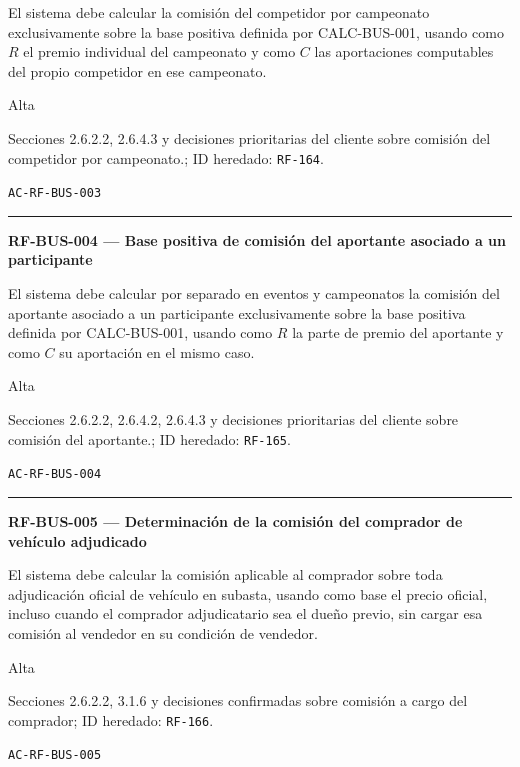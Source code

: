 \documentclass[10pt,letterpaper]{article}
\begin{document}
\begin{description}[style=nextline,leftmargin=3.15cm,labelwidth=2.8cm,font=\normalfont\bfseries]
\item[Obligación] El sistema debe calcular la comisión del competidor por campeonato exclusivamente sobre la base positiva definida por CALC-BUS-001, usando como $R$ el premio individual del campeonato y como $C$ las aportaciones computables del propio competidor en ese campeonato.
\item[Prioridad] Alta
\item[Procedencia] Secciones 2.6.2.2, 2.6.4.3 y decisiones prioritarias del cliente sobre comisión del competidor por campeonato.; ID heredado: \texttt{RF-164}.
\item[Verificación] \texttt{AC-RF-BUS-003}
\end{description}
\vspace{0.25em}\hrule\vspace{0.65em}
\noindent\textbf{RF-BUS-004 --- Base positiva de comisión del aportante asociado a un participante}\par
\begin{description}[style=nextline,leftmargin=3.15cm,labelwidth=2.8cm,font=\normalfont\bfseries]
\item[Obligación] El sistema debe calcular por separado en eventos y campeonatos la comisión del aportante asociado a un participante exclusivamente sobre la base positiva definida por CALC-BUS-001, usando como $R$ la parte de premio del aportante y como $C$ su aportación en el mismo caso.
\item[Prioridad] Alta
\item[Procedencia] Secciones 2.6.2.2, 2.6.4.2, 2.6.4.3 y decisiones prioritarias del cliente sobre comisión del aportante.; ID heredado: \texttt{RF-165}.
\item[Verificación] \texttt{AC-RF-BUS-004}
\end{description}
\vspace{0.25em}\hrule\vspace{0.65em}
\noindent\textbf{RF-BUS-005 --- Determinación de la comisión del comprador de vehículo adjudicado}\par
\begin{description}[style=nextline,leftmargin=3.15cm,labelwidth=2.8cm,font=\normalfont\bfseries]
\item[Obligación] El sistema debe calcular la comisión aplicable al comprador sobre toda adjudicación oficial de vehículo en subasta, usando como base el precio oficial, incluso cuando el comprador adjudicatario sea el dueño previo, sin cargar esa comisión al vendedor en su condición de vendedor.
\item[Prioridad] Alta
\item[Procedencia] Secciones 2.6.2.2, 3.1.6 y decisiones confirmadas sobre comisión a cargo del comprador; ID heredado: \texttt{RF-166}.
\item[Verificación] \texttt{AC-RF-BUS-005}
\end{description}
\end{document}
